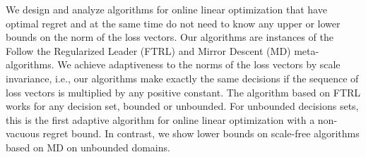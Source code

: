 We design and analyze algorithms for online linear optimization that have
optimal regret and at the same time do not need to know any upper or lower
bounds on the norm of the loss vectors. Our algorithms are instances of the
Follow the Regularized Leader (FTRL) and Mirror Descent (MD) meta-algorithms. We
achieve adaptiveness to the norms of the loss vectors by scale invariance, i.e.,
our algorithms make exactly the same decisions if the sequence of loss vectors
is multiplied by any positive constant.  The algorithm based on FTRL works for
any decision set, bounded or unbounded.  For unbounded decisions sets, this is
the first adaptive algorithm for online linear optimization with a non-vacuous
regret bound. In contrast, we show lower bounds on scale-free algorithms based
on MD on unbounded domains.

